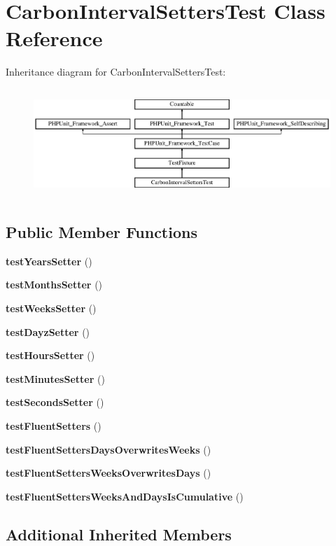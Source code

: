 \section{Carbon\+Interval\+Setters\+Test Class Reference}
\label{class_carbon_interval_setters_test}
Inheritance diagram for Carbon\+Interval\+Setters\+Test\+:\begin{figure}[H]
\begin{center}
\leavevmode
\includegraphics[height=4.129793cm]{class_carbon_interval_setters_test}
\end{center}
\end{figure}
\subsection*{Public Member Functions}
\begin{DoxyCompactItemize}
\item 
{\bf test\+Years\+Setter} ()
\item 
{\bf test\+Months\+Setter} ()
\item 
{\bf test\+Weeks\+Setter} ()
\item 
{\bf test\+Dayz\+Setter} ()
\item 
{\bf test\+Hours\+Setter} ()
\item 
{\bf test\+Minutes\+Setter} ()
\item 
{\bf test\+Seconds\+Setter} ()
\item 
{\bf test\+Fluent\+Setters} ()
\item 
{\bf test\+Fluent\+Setters\+Days\+Overwrites\+Weeks} ()
\item 
{\bf test\+Fluent\+Setters\+Weeks\+Overwrites\+Days} ()
\item 
{\bf test\+Fluent\+Setters\+Weeks\+And\+Days\+Is\+Cumulative} ()
\end{DoxyCompactItemize}
\subsection*{Additional Inherited Members}


